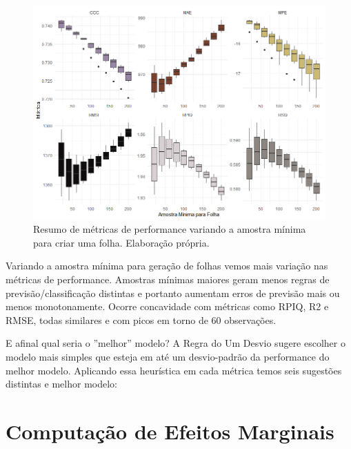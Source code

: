 \begin{figure}[H]
    \centering
    \includegraphics[scale = .70]{imagens/crossv_min.png}
    \caption{Resumo de métricas de performance variando a amostra mínima para criar uma folha. Elaboração própria.}
\end{figure}


Variando a amostra mínima para geração de folhas vemos mais variação nas métricas de performance. Amostras mínimas maiores geram menos regras de previsão/classificação distintas e portanto aumentam erros de previsão mais ou menos monotonamente. Ocorre concavidade com métricas como RPIQ, R2 e RMSE, todas similares e com picos em torno de 60 observações. 

E afinal qual seria o ''melhor'' modelo? A Regra do Um Desvio \cite{breiman1984classification} sugere escolher o modelo mais simples que esteja em até um desvio-padrão da performance do melhor modelo. Aplicando essa heurística em cada métrica temos seis sugestões distintas e melhor modelo:





\section{Computação de Efeitos Marginais}
